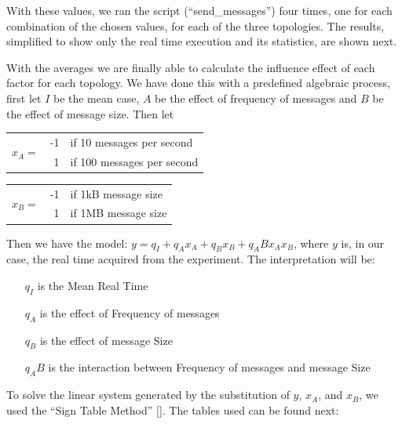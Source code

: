 With these values, we ran the script (``send_messages'') four times, one for each combination of the chosen values, for each of the three topologies. The results, simplified to show only the real time execution and its statistics, are shown next.


	
With the averages we are finally able to calculate the influence effect of each factor for each topology. We have done this with a predefined algebraic process, first let $I$ be the mean case, $A$ be the effect of frequency of messages and $B$ be the effect of message size. Then let

\begin{center}
	\begin{tabular}{c | r l}
		\multirow{2}{*}{$x _A = $} & -1 & if 10  messages per second \\
		                           &  1 & if 100 messages per second \\
	\end{tabular}
\end{center}

\begin{center}
	\begin{tabular}{c | r l}
		\multirow{2}{*}{$x _B = $} & -1 & if 1kB message size \\
		                           &  1 & if 1MB message size \\
	\end{tabular}
\end{center}

Then we have the model: $y = q _I + q _A x _A + q _B x _B + q _AB x _A x _B $, where $y$ is, in our case, the real time acquired from the experiment. The interpretation will be:
\begin{itemize}
	\item[$q _I$] is the Mean Real Time
	\item[$q _A$] is the effect of Frequency of messages
	\item[$q _B$] is the effect of message Size
	\item[$q _AB$] is the interaction between Frequency of messages and message Size
\end{itemize}

To solve the linear system generated by the substitution of $y$, $x _A$, and $x _B$, we used the ``Sign Table Method'' [\citet{2KFACTORIAL}]. The tables used can be found next:





